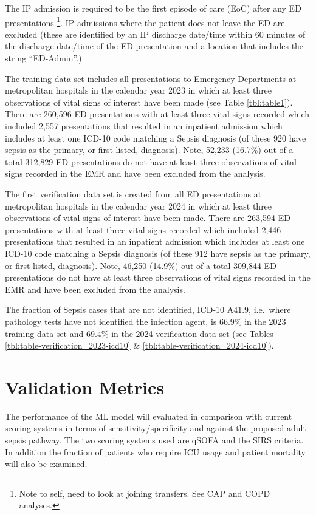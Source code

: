 \documentclass[
  a4paper,
  ,captions=tableheading
]{scrartcl}
\begin{document}
The IP admission is required to be the first episode of care (EoC) after
any ED presentations \footnote{Note to self, need to look at joining
  transfers. See CAP and COPD analyses.}. IP admissions where the
patient does not leave the ED are excluded (these are identified by an
IP discharge date/time within 60 minutes of the discharge date/time of
the ED presentation and a location that includes the string
``ED-Admin''.)

The training data set includes all presentations to Emergency
Departments at metropolitan hospitals in the calendar year 2023 in which
at least three observations of vital signs of interest have been made
(see Table \ref{tbl:table1}). There are 260,596 ED presentations with at
least three vital signs recorded which included 2,557 presentations that
resulted in an inpatient admission which includes at least one ICD-10
code matching a Sepsis diagnosis (of these 920 have sepsis as the
primary, or first-listed, diagnosis). Note, 52,233 (16.7\%) out of a
total 312,829 ED presentations do not have at least three observations
of vital signs recorded in the EMR and have been excluded from the
analysis.

The first verification data set is created from all ED presentations at
metropolitan hospitals in the calendar year 2024 in which at least three
observations of vital signs of interest have been made. There are
263,594 ED presentations with at least three vital signs recorded which
included 2,446 presentations that resulted in an inpatient admission
which includes at least one ICD-10 code matching a Sepsis diagnosis (of
these 912 have sepsis as the primary, or first-listed, diagnosis). Note,
46,250 (14.9\%) out of a total 309,844 ED presentations do not have at
least three observations of vital signs recorded in the EMR and have
been excluded from the analysis.

The fraction of Sepsis cases that are not identified, ICD-10 A41.9,
i.e.~where pathology tests have not identified the infection agent, is
66.9\% in the 2023 training data set and 69.4\% in the 2024 verification
data set (see Tables \ref{tbl:table-verification_2023-icd10} \&
\ref{tbl:table-verification_2024-icd10}).

\newpage

\section{Validation Metrics}\label{validation-metrics}

The performance of the ML model will evaluated in comparison with
current scoring systems in terms of sensitivity/specificity and against
the proposed adult sepsis pathway. The two scoring systems used are
qSOFA and the SIRS criteria. In addition the fraction of patients who
require ICU usage and patient mortality will also be examined.
\end{document}
